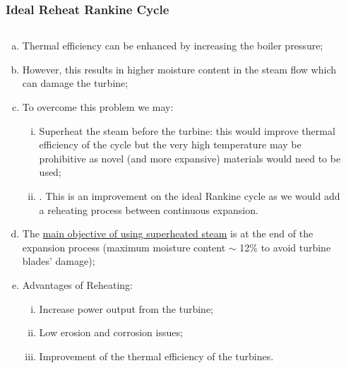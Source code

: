 \documentclass[10pt,compress,handout,unknownkeysallowed]{beamer}
\begin{document}
\begin{frame}
 \frametitle{Ideal Reheat Rankine Cycle}
  \begin{columns}
     \begin{column}[c]{0.5\linewidth}
        \begin{enumerate}[(a)] \scriptsize
           \item<1-> Thermal efficiency can be enhanced by increasing the boiler pressure;
           \item<1-> However, this results in higher moisture content in the steam flow which can damage the turbine;
           \item<2-> To overcome this problem we may:
           \begin{enumerate}[(i)] \scriptsize
             \item<2-> Superheat the steam before the turbine: this would improve thermal efficiency of the cycle but the very high temperature may be prohibitive as novel (and more expansive) materials would need to be used;
             \item<2-> . This is an improvement on the ideal Rankine cycle as we would add a reheating process between continuous expansion.
           \end{enumerate}
           \item<3-> The \underline{main objective of using superheated steam} is  at the end of the expansion process (maximum moisture content $\sim$ 12$\%$ to avoid turbine blades' damage);
           \item<4-> Advantages of Reheating:
              \begin{enumerate}[(i)]\scriptsize
                 \item<4-> Increase power output from the turbine;
                 \item<4-> Low erosion and corrosion issues;
                 \item<4-> Improvement of the thermal efficiency of the turbines.
              \end{enumerate}
        \end{enumerate}
     \end{column}
     \begin{column}[c]{0.5\linewidth} 
\end{column}
\end{columns}
\end{frame}
\end{document}
